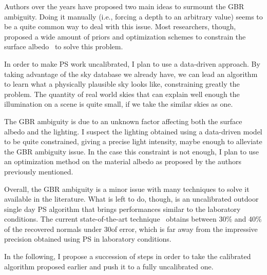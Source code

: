 Authors over the years have proposed two main ideas to surmount the GBR ambiguity. Doing it manually (i.e., forcing a depth to an arbitrary value) seems to be a quite common way to deal with this issue. Most researchers, though, proposed a wide amount of priors and optimization schemes to constrain the surface albedo~\cite{tan-cvpr-07,alldrin-cvpr-08,abrams-eccv-12,queau-jmiv-14} to solve this problem.

In order to make PS work uncalibrated, I plan to use a data-driven approach. By taking advantage of the sky database we already have, we can lead an algorithm to learn what a physically plausible sky looks like, constraining greatly the problem. The quantity of real world skies that can explain well enough the illumination on a scene is quite small, if we take the similar skies as one.

The GBR ambiguity is due to an unknown factor affecting both the surface albedo and the lighting. I suspect the lighting obtained using a data-driven model to be quite constrained, giving a precise light intensity, maybe enough to alleviate the GBR ambiguity issue. In the case this constraint is not enough, I plan to use an optimization method on the material albedo as proposed by the authors previously mentioned.

Overall, the GBR ambiguity is a minor issue with many techniques to solve it available in the literature. What is left to do, though, is an uncalibrated outdoor single day PS algorithm that brings performances similar to the laboratory conditions. The current state-of-the-art technique~\cite{jung-cvpr-15} obtains between 30\% and 40\% of the recovered normals under 30\degree of error, which is far away from the impressive precision obtained using PS in laboratory conditions.

In the following, I propose a succession of steps in order to take the calibrated algorithm proposed earlier and push it to a fully uncalibrated one.



